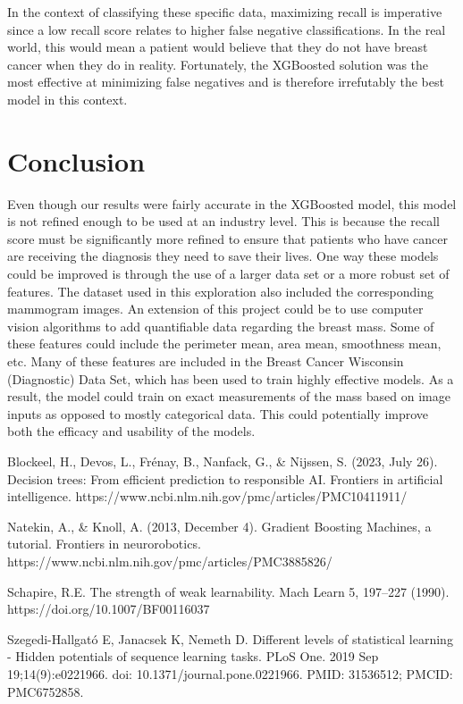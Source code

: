 \documentclass[twoside,twocolumn]{article}
\begin{document}
In the context of classifying these specific data, maximizing recall is imperative since a low recall score relates to higher false negative classifications. In the real world, this would mean a patient would believe that they do not have breast cancer when they do in reality. Fortunately, the XGBoosted solution was the most effective at minimizing false negatives and is therefore irrefutably the best model in this context.


\section{Conclusion}
Even though our results were fairly accurate in the XGBoosted model, this model is not refined enough to be used at an industry level. This is because the recall score must be significantly more refined to ensure that patients who have cancer are receiving the diagnosis they need to save their lives. One way these models could be improved is through the use of a larger data set or a more robust set of features. The dataset used in this exploration also included the corresponding mammogram images. An extension of this project could be to use computer vision algorithms to add quantifiable data regarding the breast mass. Some of these features could include the perimeter mean, area mean, smoothness mean, etc. Many of these features are included in the Breast Cancer Wisconsin (Diagnostic) Data Set, which has been used to train highly effective models. As a result, the model could train on exact measurements of the mass based on image inputs as opposed to mostly categorical data. This could potentially improve both the efficacy and usability of the models.


\begin{thebibliography}{99} %
\bibitem{}Blockeel, H., Devos, L., Frénay, B., Nanfack, G., \& Nijssen, S. (2023, July 26). Decision trees: From efficient prediction to responsible AI. Frontiers in artificial intelligence. https://www.ncbi.nlm.nih.gov/pmc/articles/PMC10411911/

\bibitem{}Natekin, A., \& Knoll, A. (2013, December 4). Gradient Boosting Machines, a tutorial. Frontiers in neurorobotics. https://www.ncbi.nlm.nih.gov/pmc/articles/PMC3885826/

\bibitem{}Schapire, R.E. The strength of weak learnability. Mach Learn 5, 197–227 (1990). https://doi.org/10.1007/BF00116037

\bibitem{}Szegedi-Hallgató E, Janacsek K, Nemeth D. Different levels of statistical learning - Hidden potentials of sequence learning tasks. PLoS One. 2019 Sep 19;14(9):e0221966. doi: 10.1371/journal.pone.0221966. PMID: 31536512; PMCID: PMC6752858.

\end{thebibliography}
\end{document}
